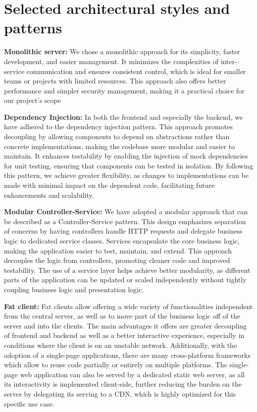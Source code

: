\section{Selected architectural styles and patterns}
\textbf{Monolithic server:} 
We chose a monolithic approach for its simplicity, faster development, and easier management. It minimizes the complexities of inter-service communication and ensures consistent control, which is ideal for smaller teams or projects with limited resources. This approach also offers better performance and simpler security management, making it a practical choice for our project’s scope

\textbf{Dependency Injection:}
In both the frontend and especially the backend, we have adhered to the dependency injection pattern. This approach promotes decoupling by allowing components to depend on abstractions rather than concrete implementations, making the codebase more modular and easier to maintain. It enhances testability by enabling the injection of mock dependencies for unit testing, ensuring that components can be tested in isolation. By following this pattern, we achieve greater flexibility, as changes to implementations can be made with minimal impact on the dependent code, facilitating future enhancements and scalability.

\textbf{Modular Controller-Service:}
We have adopted a modular approach that can be described as a Controller-Service pattern. This design emphasizes separation of concerns by having controllers handle HTTP requests and delegate business logic to dedicated service classes. Services encapsulate the core business logic, making the application easier to test, maintain, and extend. This approach decouples the logic from controllers, promoting cleaner code and improved testability. The use of a service layer helps achieve better modularity, as different parts of the application can be updated or scaled independently without tightly coupling business logic and presentation logic.

\textbf{Fat client:}
Fat clients allow offering a wide variety of functionalities independent from the central server, as well as to move part of the business logic off of the server and into the clients. The main advantages it offers are greater decoupling of frontend and backend as well as a better interactive experience, especially in conditions where the client is on an unstable network. Additionally, with the adoption of a single-page applications, there are many cross-platform frameworks which allow to reuse code partially or entirely on multiple platforms. The single-page web application can also be served by a dedicated static web server, as all its interactivity is implemented client-side, further reducing the burden on the server by delegating its serving to a CDN, which is highly optimized for
this specific use case.

